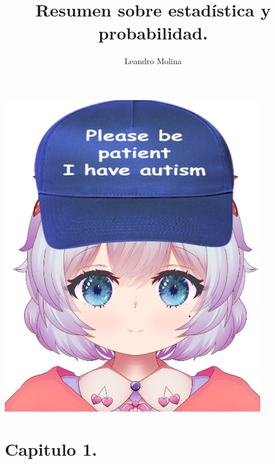 \documentclass[]{article}
\title{Resumen sobre estadística y probabilidad.}
\author{Leandro Molina}
\begin{document}
\maketitle
\vspace{-20pt}

\noindent
\includegraphics[width=\linewidth, height=14cm]{twin_autism.jpg}
\pagebreak

\tableofcontents

\pagebreak
\section{Capitulo 1.}
\end{document}
